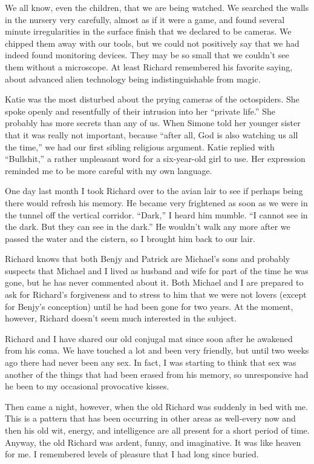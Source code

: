 \documentclass[]{article}
\begin{document}
{We all know, even the children, that we are being watched. We searched the walls in the nursery very carefully, almost as if it were a game, and found several minute irregularities in the surface finish that we declared to be cameras. We chipped them away with our tools, but we could not positively say that we had indeed found monitoring devices. They may be so small that we couldn’t see them without a microscope. At least Richard remembered his favorite saying, about advanced alien technology being indistinguishable from magic.

Katie was the most disturbed about the prying cameras of the octospiders. She spoke openly and resentfully of their intrusion into her “private life.” She probably has more secrets than any of us. When Simone told her younger sister that it was really not important, because “after all, God is also watching us all the time,” we had our first sibling religious argument. Katie replied with “Bullshit,” a rather unpleasant word for a six-year-old girl to use. Her expression reminded me to be more careful with my own language.

One day last month I took Richard over to the avian lair to see if perhaps being there would refresh his memory. He became very frightened as soon as we were in the tunnel off the vertical corridor. “Dark,” I heard him mumble. “I cannot see in the dark. But they can see in the dark.” He wouldn’t walk any more after we passed the water and the cistern, so I brought him back to our lair.

Richard knows that both Benjy and Patrick are Michael’s sons and probably suspects that Michael and I lived as husband and wife for part of the time he was gone, but he has never commented about it. Both Michael and I are prepared to ask for Richard’s forgiveness and to stress to him that we were not lovers (except for Benjy’s conception) until he had been gone for two years. At the moment, however, Richard doesn’t seem much interested in the subject.

Richard and I have shared our old conjugal mat since soon after he awakened from his coma. We have touched a lot and been very friendly, but until two weeks ago there had never been any sex. In fact, I was starting to think that sex was another of the things that had been erased from his memory, so unresponsive had he been to my occasional provocative kisses.

Then came a night, however, when the old Richard was suddenly in bed with me. This is a pattern that has been occurring in other areas as well-every now and then his old wit, energy, and intelligence are all present for a short period of time. Anyway, the old Richard was ardent, funny, and imaginative. It was like heaven for me. I remembered levels of pleasure that I had long since buried.

}
\end{document}
